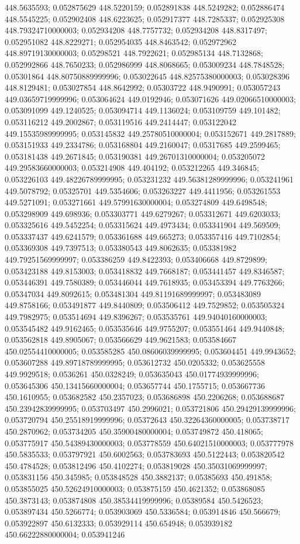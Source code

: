 448.5635593; 0.052875629 448.5220159; 0.052891838 448.5249282; 0.052886474 448.5545225; 0.052902408 448.6223625; 0.052917377 448.7285337; 0.052925308 448.79324710000003; 0.052934208 448.7757732; 0.052934208 448.8317497; 0.052951082 448.8229271; 0.052954035 448.8463542; 0.052972962 448.89719130000003; 0.05298521 448.7922621; 0.052985134 448.7132868; 0.052992866 448.7650233; 0.052986999 448.8068665; 0.053009234 448.7848528; 0.05301864 448.80750889999996; 0.053022645 448.82575380000003; 0.053028396 448.8129481; 0.053027854 448.8642992; 0.05303722 448.9490991; 0.053057243 449.03659719999996; 0.053064624 449.0192946; 0.053071626 449.02066510000003; 0.053091099 449.1240525; 0.053094714 449.1136024; 0.053109759 449.101482; 0.053116212 449.2002867; 0.053119516 449.2414447; 0.053122042 449.15535989999995; 0.053145832 449.25780510000004; 0.053152671 449.2817889; 0.053151933 449.2334786; 0.053168804 449.2160047; 0.05317685 449.2599465; 0.053181438 449.2671845; 0.053190381 449.26701310000004; 0.053205072 449.29583660000003; 0.053214908 449.404192; 0.053212265 449.346845; 0.053226103 449.48226789999995; 0.053231232 449.56381289999996; 0.053241961 449.5078792; 0.05325701 449.5354606; 0.053263227 449.4411956; 0.053261553 449.5271091; 0.053271661 449.57991630000004; 0.053274809 449.6498548; 0.053298909 449.698936; 0.053303771 449.6279267; 0.053312671 449.6203033; 0.053325616 449.5452254; 0.053315624 449.4973434; 0.053341904 449.569509; 0.053337437 449.6241579; 0.053361688 449.665273; 0.053357416 449.7102854; 0.053369308 449.7397513; 0.053380543 449.8062635; 0.053381982 449.79251569999997; 0.053386259 449.8422393; 0.053406668 449.8729899; 0.053423188 449.8153003; 0.053418832 449.7668187; 0.053441457 449.8346587; 0.053446391 449.7580389; 0.053446044 449.7618935; 0.053453394 449.7763266; 0.05347034 449.8092615; 0.053481304 449.81191689999997; 0.053483089 449.8758166; 0.053491877 449.8440809; 0.053506412 449.7529852; 0.053505324 449.7982975; 0.053514694 449.8396267; 0.053535761 449.94040160000003; 0.053545482 449.9162465; 0.053535646 449.9755207; 0.053551464 449.9440848; 0.053562818 449.8905067; 0.053566629 449.9621583; 0.053584667 450.02554410000005; 0.053585285 450.08606039999995; 0.053604451 449.9943652; 0.053607288 449.89718789999995; 0.053612732 450.0205332; 0.053625558 449.9929518; 0.0536261 450.0328249; 0.053635043 450.01774939999996; 0.053645306 450.13415660000004; 0.053657744 450.1755715; 0.053667736 450.1610955; 0.053682582 450.2357023; 0.053686898 450.2206268; 0.053688687 450.23942839999995; 0.053703497 450.2996021; 0.053721806 450.29429139999996; 0.053720794 450.25518919999996; 0.05372643 450.32264360000005; 0.053738717 450.2870962; 0.053734205 450.35900480000004; 0.053749872 450.418065; 0.053775917 450.54389430000003; 0.053778559 450.64021510000003; 0.053777978 450.5835533; 0.053797921 450.6002563; 0.053783693 450.5122443; 0.053820542 450.4784528; 0.053812496 450.4102274; 0.053819028 450.35031069999997; 0.053831156 450.345985; 0.053848528 450.3882137; 0.05385693 450.491858; 0.053855025 450.52624910000003; 0.053875159 450.4621352; 0.053868085 450.3873143; 0.053874808 450.38534419999996; 0.05389584 450.5426523; 0.053897434 450.5266774; 0.053903069 450.5336584; 0.053914846 450.566679; 0.053922897 450.6132333; 0.053929114 450.654948; 0.053939182 450.66222880000004; 0.053941246 